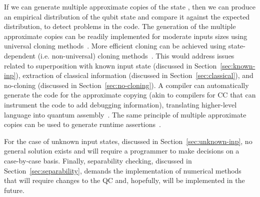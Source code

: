 \documentclass[11pt]{article}
\theoremstyle{plain}
\theoremstyle{definition}
\begin{document}
If we can generate multiple approximate copies of the state \cite{buvzek1996quantum}, then we can 
produce an empirical distribution of the qubit state and compare it against the expected 
distribution, to detect problems in the code. The generation of the multiple approximate copies can 
be readily implemented for moderate inputs sizes using universal cloning 
methods~\cite{werner1998optimal, buvzek1998universal, fan2001quantum}.  More efficient cloning can 
be achieved using state-dependent (i.e. non-universal) cloning methods~\cite{niu1999two, 
scarani2005quantum}. This would address issues related to superposition with known input state 
(discussed in Section~\ref{sec:known-inp}), extraction of classical information (discussed in 
Section~\ref{sec:classical}), and no-cloning (discussed in Section~\ref{sec:no-cloning}). A 
compiler can automatically generate the code for the approximate copying (akin to compilers for CC 
that can instrument the code to add debugging information), translating higher-level language into 
quantum assembly~\cite{huang2019statistical}. The same principle of multiple approximate copies can 
be used to generate runtime assertions~\cite{zhou2019quantum}.

For the case of unknown input states, discussed in Section~\ref{sec:unknown-inp}, no general 
solution exists and will require a programmer to make decisions on a case-by-case basis.
Finally, separability checking, discussed in Section~\ref{sec:separability}, demands the 
implementation of numerical methods that will require changes to the QC and, hopefully, will be 
implemented in the future. 




\end{document}
